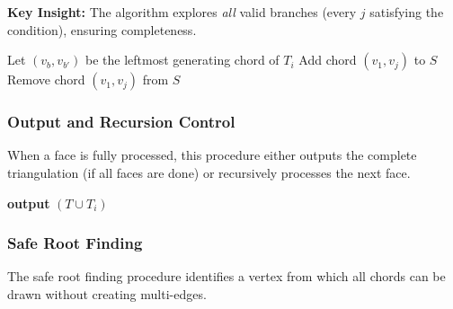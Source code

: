 \documentclass[12pt,a4paper]{article}
\theoremstyle{definition}
\theoremstyle{remark}
\begin{document}
\textbf{Key Insight:} The algorithm explores \emph{all} valid branches (every $j$ satisfying the condition), ensuring completeness.

\begin{algorithm}
\caption{Find All Child Triangulations in Local Tree}
\label{alg:child_triangulations}
\begin{algorithmic}[1]
    \State {}
        \State \Return {}
    \EndIf
    \State Let $(v_b, v_{b'})$ be the leftmost generating chord of $T_i$
            \State Add chord $(v_1, v_j)$ to $S$
            \State {}
            \State Remove chord $(v_1, v_j)$ from $S$
        \EndIf
    \EndFor
\EndProcedure
\end{algorithmic}
\end{algorithm}


\subsubsection{Output and Recursion Control}

When a face is fully processed, this procedure either outputs the complete triangulation (if all faces are done) or recursively processes the next face.

\begin{algorithm}
\caption{Output Triangulation or Continue to Next Face}
\label{alg:output}
\begin{algorithmic}[1]
     
        \State \textbf{output} $(T \cup T_i)$
    \Else
        \State {}
    \EndIf
\EndProcedure
\end{algorithmic}
\end{algorithm}


\subsubsection{Safe Root Finding}

The safe root finding procedure identifies a vertex from which all chords can be drawn without creating multi-edges.
\end{document}
